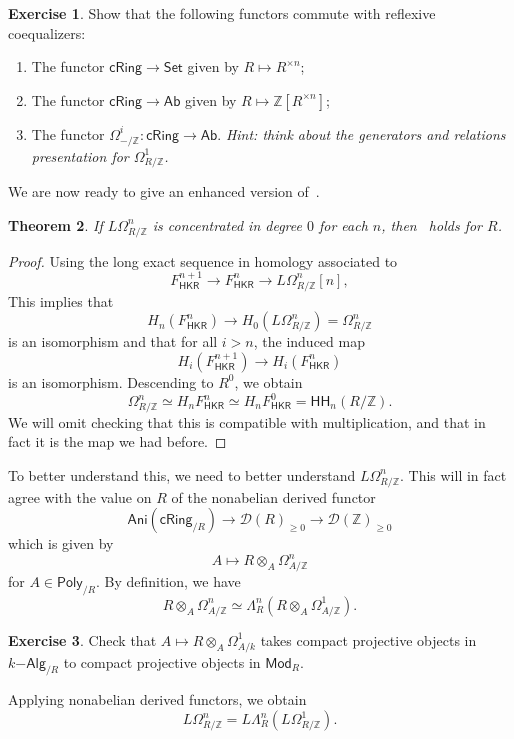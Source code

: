 \documentclass[10pt, oneside]{memoir}
\newtheorem{thm}{Theorem}[subsection]
\theoremstyle{definition}
\newtheorem{exer}[thm]{Exercise}
\theoremstyle{remark}
\theoremstyle{plain}
\theoremstyle{definition}
\theoremstyle{remark}
\newcommand{\Z}{\mathbb{Z}}
\newcommand{\mc}[1]{\mathcal{#1}}
\newcommand{\ms}[1]{\mathsf{#1}}
\newcommand{\1}{\mathbf{1}}
\newcommand{\2}{\mathbf{2}}
\newcommand{\3}{\mathbf{3}}
\newcommand{\HH}{\ms{HH}}
\begin{document}
\begin{exer}
    Show that the following functors commute with reflexive coequalizers:
    \begin{enumerate}
        \item The functor \(\ms{cRing} \to \ms{Set} \) given by \(R \mapsto R^{\times n} \);
        \item The functor \(\ms{cRing} \to \ms{Ab} \) given by \(R \mapsto \Z[R^{\times n}] \);
        \item The functor \(\Omega^i_{-/\Z} \colon \ms{cRing} \to \ms{Ab} \). \textit{Hint: think about the generators and relations presentation for \(\Omega^1_{R/\Z} \).}
    \end{enumerate}
\end{exer}

We are now ready to give an enhanced version of~.
\begin{thm}\label{thm:filteredhkr}
    If \(L\Omega^n_{R/\Z} \) is concentrated in degree \(0 \) for each \(n \), then~ holds for \(R \).
\end{thm}

\begin{proof}
    Using the long exact sequence in homology associated to
    \[ F_{\ms{HKR}}^{n+1} \to F_{\ms{HKR}}^n \to L\Omega^n_{R/\Z}[n], \]
    This implies that
    \[ H_n (F^n_{\ms{HKR}}) \to H_0(L\Omega^n_{R/\Z}) = \Omega^n_{R/\Z} \]
    is an isomorphism and that for all \(i > n \), the induced map
    \[ H_i(F^{n+1}_{\ms{HKR}}) \to H_i(F^n_{\ms{HKR}}) \]
    is an isomorphism. Descending to \(R^0 \), we obtain
    \[ \Omega^n_{R/\Z} \simeq H_n F_{\ms{HKR}}^n \simeq H_n F^0_{\ms{HKR}} = \HH_n(R/\Z). \]
    We will omit checking that this is compatible with multiplication, and that in fact it is the map we had before.
\end{proof}

To better understand this, we need to better understand \(L\Omega^n_{R/\Z} \). This will in fact agree with the value on \(R \) of the nonabelian derived functor
\[ \ms{Ani}(\ms{cRing}_{/R}) \to \mc{D}(R)_{\geq 0} \to \mc{D}(\Z)_{\geq 0} \]
which is given by
\[ A \mapsto R \otimes_A \Omega_{A/\Z}^n \]
for \(A \in \ms{Poly}_{/R} \). By definition, we have
\[ R \otimes_A \Omega^n_{A/\Z} \simeq \Lambda_R^n (R \otimes_A \Omega^1_{A/\Z}). \]
\begin{exer}
    Check that \(A \mapsto R \otimes_A \Omega^1_{A/k} \) takes compact projective objects in \(k\ms{-Alg}_{/R} \) to compact projective objects in \(\ms{Mod}_R \).
\end{exer}
Applying nonabelian derived functors, we obtain
\[ L\Omega^n_{R/\Z} = L \Lambda^n_R (L \Omega^1_{R/\Z}). \]
\end{document}
